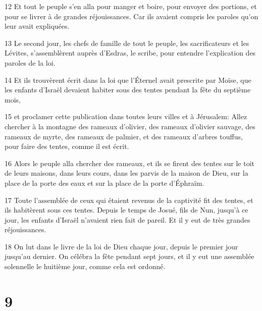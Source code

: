 \par 12 Et tout le peuple s'en alla pour manger et boire, pour envoyer des portions, et pour se livrer à de grandes réjouissances. Car ils avaient compris les paroles qu'on leur avait expliquées.
\par 13 Le second jour, les chefs de famille de tout le peuple, les sacrificateurs et les Lévites, s'assemblèrent auprès d'Esdras, le scribe, pour entendre l'explication des paroles de la loi.
\par 14 Et ils trouvèrent écrit dans la loi que l'Éternel avait prescrite par Moïse, que les enfants d'Israël devaient habiter sous des tentes pendant la fête du septième mois,
\par 15 et proclamer cette publication dans toutes leurs villes et à Jérusalem: Allez chercher à la montagne des rameaux d'olivier, des rameaux d'olivier sauvage, des rameaux de myrte, des rameaux de palmier, et des rameaux d'arbres touffus, pour faire des tentes, comme il est écrit.
\par 16 Alors le peuple alla chercher des rameaux, et ils se firent des tentes sur le toit de leurs maisons, dans leurs cours, dans les parvis de la maison de Dieu, sur la place de la porte des eaux et sur la place de la porte d'Éphraïm.
\par 17 Toute l'assemblée de ceux qui étaient revenus de la captivité fit des tentes, et ils habitèrent sous ces tentes. Depuis le temps de Josué, fils de Nun, jusqu'à ce jour, les enfants d'Israël n'avaient rien fait de pareil. Et il y eut de très grandes réjouissances.
\par 18 On lut dans le livre de la loi de Dieu chaque jour, depuis le premier jour jusqu'au dernier. On célébra la fête pendant sept jours, et il y eut une assemblée solennelle le huitième jour, comme cela est ordonné.

\chapter{9}

